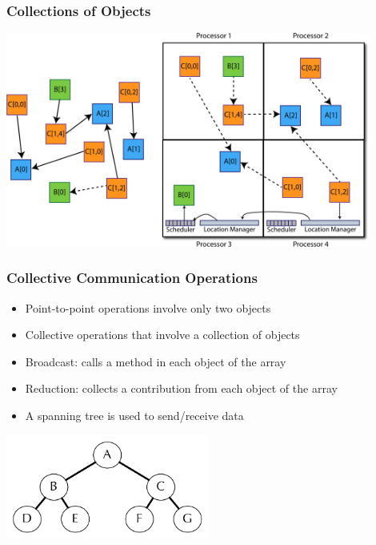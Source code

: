 \begin{frame}[fragile]
  \frametitle{Collections of Objects}
  \begin{center}\includegraphics[width=0.9\textwidth]{figures/elements2.pdf}\end{center}
\end{frame}

\begin{frame}[fragile]
  \frametitle{Collective Communication Operations}
  \begin{itemize}
    \item Point-to-point operations involve only two objects
    \item Collective operations that involve a collection of objects
    \item Broadcast: calls a method in each object of the array
    \item Reduction: collects a contribution from each object of the array
    \item A spanning tree is used to send/receive data
  \end{itemize}
    \begin{center} \includegraphics[width=0.5\textwidth]{figures/spanningTree.pdf} \end{center}
\end{frame}


